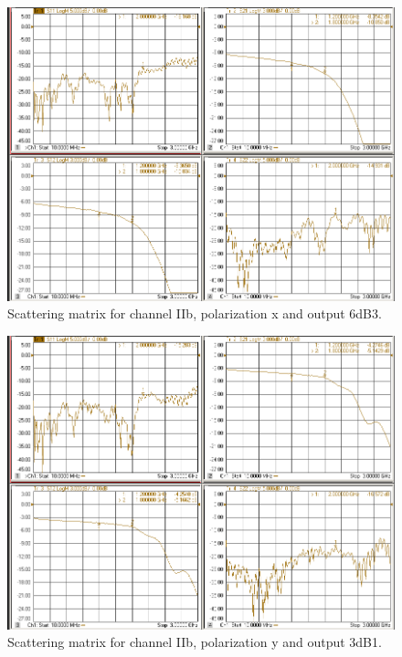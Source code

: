 \documentclass[12pt,a4paper,oneside]{article}
\begin{document}
\begin{figure}[H]
\centering
\includegraphics[width=0.9\linewidth]{VNA_results/IIbx_6dB3.png}
\caption{Scattering matrix for channel IIb, polarization x and output 6dB3.}
\label{fig:IIbx_6dB3}
\end{figure}


\begin{figure}[H]
\centering
\includegraphics[width=0.9\linewidth]{VNA_results/IIby_3dB1.png}
\caption{Scattering matrix for channel IIb, polarization y and output 3dB1.}
\label{fig:IIby_3dB1}
\end{figure}
\end{document}
